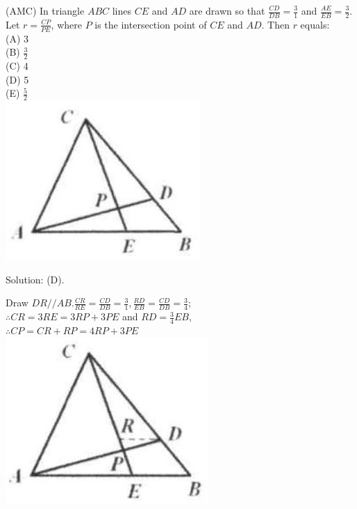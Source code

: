 \documentclass{article}
\begin{document}
(AMC) In triangle \(A B C\) lines \(C E\) and \(A D\) are drawn so that \(\frac{C D}{D B}=\frac{3}{1}\) and \(\frac{A E}{E B}=\frac{3}{2}\). Let \(r=\frac{C P}{P E}\), where \(P\) is the intersection point of \(C E\) and \(A D\). Then \(r\) equals:\\
(A) 3\\
(B) \(\frac{3}{2}\)\\
(C) 4\\
(D) 5\\
(E) \(\frac{5}{2}\)\\
\centering
\includegraphics[width=\textwidth]{images/107(1).jpg}

Solution: (D).


Draw \(D R / / A B . \frac{C R}{R E}=\frac{C D}{D B}=\frac{3}{1}, \frac{R D}{E B}=\frac{C D}{D B}=\frac{3}{4}\);\\
\(\therefore C R=3 R E=3 R P+3 P E\) and \(R D=\frac{3}{4} E B\),\\
\(\therefore C P=C R+R P=4 R P+3 P E\)\\
\centering
\includegraphics[width=\textwidth]{images/108(2).jpg}
\end{document}
